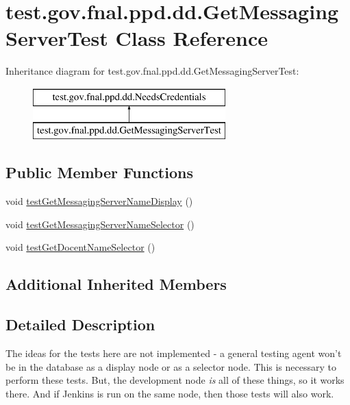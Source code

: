\hypertarget{classtest_1_1gov_1_1fnal_1_1ppd_1_1dd_1_1GetMessagingServerTest}{\section{test.\-gov.\-fnal.\-ppd.\-dd.\-Get\-Messaging\-Server\-Test Class Reference}
\label{classtest_1_1gov_1_1fnal_1_1ppd_1_1dd_1_1GetMessagingServerTest}
}
Inheritance diagram for test.\-gov.\-fnal.\-ppd.\-dd.\-Get\-Messaging\-Server\-Test\-:\begin{figure}[H]
\begin{center}
\leavevmode
\includegraphics[height=2.000000cm]{classtest_1_1gov_1_1fnal_1_1ppd_1_1dd_1_1GetMessagingServerTest}
\end{center}
\end{figure}
\subsection*{Public Member Functions}
\begin{DoxyCompactItemize}
\item 
void \hyperlink{classtest_1_1gov_1_1fnal_1_1ppd_1_1dd_1_1GetMessagingServerTest_a3601b6819ca638d7b1a0363eaa6ca475}{test\-Get\-Messaging\-Server\-Name\-Display} ()
\item 
void \hyperlink{classtest_1_1gov_1_1fnal_1_1ppd_1_1dd_1_1GetMessagingServerTest_a087a371914143672310e30fc4b71decc}{test\-Get\-Messaging\-Server\-Name\-Selector} ()
\item 
void \hyperlink{classtest_1_1gov_1_1fnal_1_1ppd_1_1dd_1_1GetMessagingServerTest_a797ca314d02f3394cad4c88f95eee5bc}{test\-Get\-Docent\-Name\-Selector} ()
\end{DoxyCompactItemize}
\subsection*{Additional Inherited Members}


\subsection{Detailed Description}
The ideas for the tests here are not implemented -\/ a general testing agent won't be in the database as a display node or as a selector node. This is necessary to perform these tests. But, the development node {\itshape is} all of these things, so it works there. And if Jenkins is run on the same node, then those tests will also work.


